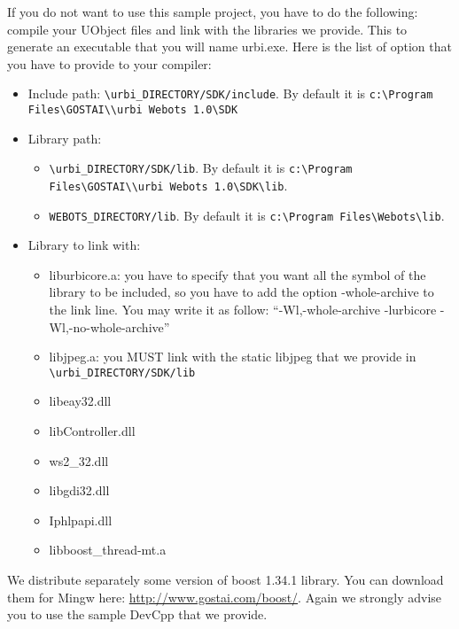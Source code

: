 If you do not want to use this sample project, you have to do the
following: compile your UObject files and link with the libraries we
provide. This to generate an executable that you will name urbi.exe.
Here is the list of option that you have to provide to your compiler:
\begin{itemize}

\item Include path: \nolinkurl{\urbi_DIRECTORY/SDK/include}. By default it is
 \nolinkurl{c:\Program Files\GOSTAI\\urbi Webots 1.0\SDK}


\item Library path:
 \begin{itemize}

 \item \nolinkurl{\urbi_DIRECTORY/SDK/lib}. By default it is
   \nolinkurl{c:\Program Files\GOSTAI\\urbi Webots 1.0\SDK\lib}.



 \item{}  \nolinkurl{WEBOTS_DIRECTORY/lib}. By default it is
   \nolinkurl{c:\Program Files\Webots\lib}.


 \end{itemize}



\item{}         Library to link with:
  \begin{itemize}

  \item{} liburbicore.a: you have to specify that you want all the
    symbol of the library to be included, so you have to add the option
    -{}whole-{}archive to the link line. You may write it as follow:
    ``-{}Wl,-{}whole-{}archive -{}lurbicore
    -{}Wl,-{}no-{}whole-{}archive''

  \item{} libjpeg.a: you MUST link with the static libjpeg that we
    provide in \nolinkurl{\urbi_DIRECTORY/SDK/lib}
  \item{} libeay32.dll
  \item{} libController.dll
  \item{} ws2\_32.dll
  \item{} libgdi32.dll
  \item{} Iphlpapi.dll
  \item{} libboost\_thread-{}mt.a
  \end{itemize}


\end{itemize}
We distribute separately some version of boost 1.34.1 library. You can
download them for Mingw here: \url{http://www.gostai.com/boost/}.
Again we strongly advise you to use the sample DevCpp that we provide.


